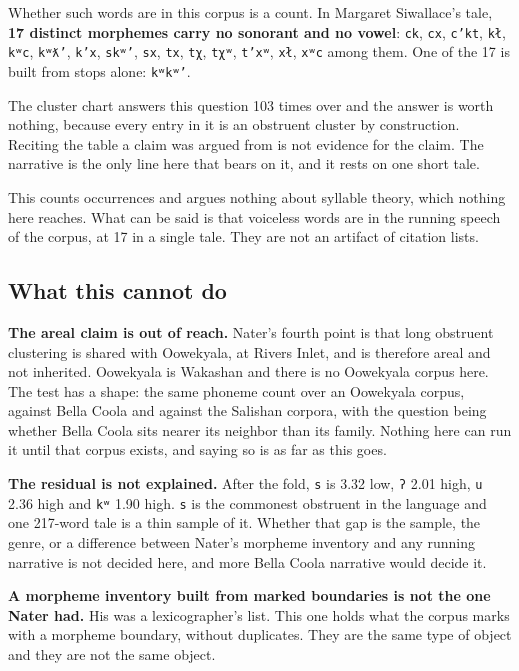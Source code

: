 Whether such words are in this corpus is a count. In Margaret Siwallace's tale, \textbf{17 distinct
morphemes carry no sonorant and no vowel}: \texttt{ck}, \texttt{cx}, \texttt{c'kt}, \texttt{kł},
\texttt{kʷc}, \texttt{kʷƛ'}, \texttt{k'x}, \texttt{skʷ'}, \texttt{sx}, \texttt{tx}, \texttt{tχ},
\texttt{tχʷ}, \texttt{t'xʷ}, \texttt{xł}, \texttt{xʷc} among them. One of the 17 is built from stops
alone: \texttt{kʷkʷ'}.

The cluster chart answers this question 103 times over and the answer is worth nothing, because
every entry in it is an obstruent cluster by construction. Reciting the table a claim was argued
from is not evidence for the claim. The narrative is the only line here that bears on it, and it
rests on one short tale.

This counts occurrences and argues nothing about syllable theory, which nothing here reaches. What can be
said is that voiceless words are in the running speech of the corpus, at 17 in a single tale. They are
not an artifact of citation lists.

\subsection{What this cannot do}

\textbf{The areal claim is out of reach.} Nater's fourth point is that long obstruent clustering is
shared with Oowekyala, at Rivers Inlet, and is therefore areal and not inherited. Oowekyala is
Wakashan and there is no Oowekyala corpus here. The test has a shape: the same phoneme count over an
Oowekyala corpus, against Bella Coola and against the Salishan corpora, with the question being
whether Bella Coola sits nearer its neighbor than its family. Nothing here can run it until that
corpus exists, and saying so is as far as this goes.

\textbf{The residual is not explained.} After the fold, \texttt{s} is 3.32 low, \texttt{ʔ} 2.01
high, \texttt{u} 2.36 high and \texttt{kʷ} 1.90 high. \texttt{s} is the commonest obstruent in
the language and one 217-word tale is a thin sample of it. Whether that gap is the sample, the
genre, or a difference between Nater's morpheme inventory and any running narrative is not decided
here, and more Bella Coola narrative would decide it.

\textbf{A morpheme inventory built from marked boundaries is not the one Nater had.} His was a
lexicographer's list. This one holds what the corpus marks with a morpheme boundary, without duplicates.
They are the same type of object and they are not the same object.
